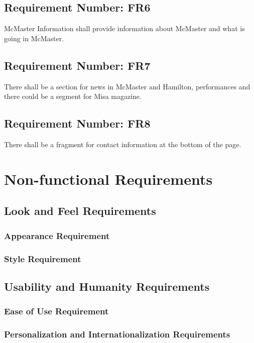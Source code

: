 \documentclass[12pt, titlepage]{article}
\begin{document}
\subsection{Requirement Number: FR6}
McMaster Information shall provide information about McMaster and what is going in McMaster. 

\subsection{Requirement Number: FR7}
There shall be a section for news in McMaster and Hamilton, performances and there could be a segment for Misa magazine.

\subsection{Requirement Number: FR8}
There shall be a fragment for contact information at the bottom of the page.


\section{Non-functional Requirements}

\subsection{Look and Feel Requirements}
\subsubsection{Appearance Requirement}


\subsubsection{Style Requirement}



\subsection{Usability and Humanity Requirements}
\subsubsection{Ease of Use Requirement}
 

\subsubsection{Personalization and Internationalization Requirements}
\end{document}
